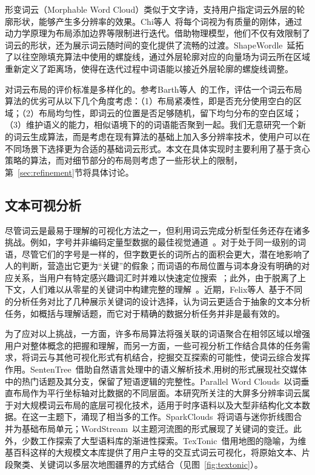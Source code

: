 形变词云（Morphable Word Cloud）类似于文字诗，支持用户指定词云外层的轮廓形状，能够产生多分辨率的效果。Chi等人~\supercite{Chi2015}将每个词视为有质量的刚体，通过动力学原理为布局添加边界等限制进行迭代。借助物理模型，他们不仅有效限制了词云的形状，还为展示词云随时间的变化提供了流畅的过渡。ShapeWordle~\supercite{Wang2020}延拓了以往空隙填充算法中使用的螺旋线，通过外层轮廓对应的向量场为词云所在区域重新定义了距离场，使得在迭代过程中词语能以接近外层轮廓的螺旋线调整。

对词云布局的评价标准是多样化的。参考Barth等人~\supercite{Barth2014}的工作，评估一个词云布局算法的优劣可从以下几个角度考虑：（1）布局紧凑性，即是否充分使用空白的区域；（2）布局均匀性，即词云的位置是否足够随机，留下均匀分布的空白区域；（3）维护语义的能力，相似语境下的的词语能否聚到一起。我们无意研究一个新的词云生成算法，而是考虑在现有算法的基础上加入多分辨率技术，使用户可以在不同场景下选择更为合适的基础词云形式。本文在具体实现时主要利用了基于贪心策略的算法，而对细节部分的布局则考虑了一些形状上的限制，第~\ref{sec:refinement}节将具体讨论。

\subsection{文本可视分析}
尽管词云是最易于理解的可视化方法之一，但利用词云完成分析型任务还存在诸多挑战。例如，字号并非编码定量型数据的最佳视觉通道~\supercite{Munzner2014}。对于处于同一级别的词语，尽管它们的字号是一样的，但字数更长的词所占的面积会更大，潜在地影响了人的判断，营造出它更为``关键''的假象；而词语的布局位置与词本身没有明确的对应关系，当用户有特定感兴趣词汇时并难以快速定位搜索~\supercite{Lohmann2009}；此外，由于脱离了上下文，人们难以从零星的关键词中构建完整的理解~\supercite{Viegas2008}。近期，Felix等人~\supercite{Felix2018}基于不同的分析任务对比了几种展示关键词的设计选择，认为词云更适合于抽象的文本分析任务，如概括与理解话题，而它对于精确的数据分析任务并非是最有效的。

为了应对以上挑战，一方面，许多布局算法将强关联的词语聚合在相邻区域以增强用户对整体概念的把握和理解，而另一方面，一些可视分析工作结合具体的任务需求，将词云与其他可视化形式有机结合，挖掘交互探索的可能性，使词云综合发挥作用。SentenTree~\supercite{Hu2017}借助自然语言处理中的语义解析技术,用树的形式展现社交媒体中的热门话题及其分支，保留了短语逻辑的完整性。Parallel Word Clouds~\supercite{Collins2009}以词垂直布局作为平行坐标轴对比数据的不同层面。本研究所关注的大屏多分辨率词云属于对大规模词云布局的底层可视化技术，适用于时序语料以及大型非结构化文本数据。在这一主题下，涌现了相当多的工作。SparkClouds~\supercite{Lee2010}将词语与迷你折线图合并为基础布局单元；WordStream~\supercite{Dang2019}以主题河流图的形式展现了关键词的变迁。此外，少数工作探索了大型语料库的渐进性探索。TexTonic~\supercite{Paul2019}借用地图的隐喻，为维基百科这样的大规模文本库提供了用户主导的交互式词云可视化，将原始文本、片段聚类、关键词以多层次地图疆界的方式结合（见图~\ref{fig:textonic}）。

